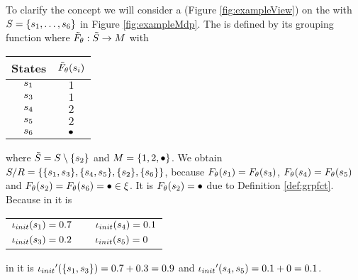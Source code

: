 \documentclass[preview]{standalone}
\begin{document}
\begin{exmp}
\sloppy
To clarify the concept we will consider a \viewN \view (Figure \ref{fig:exampleView}) on the \mdpN \mdp with ${S} = \{{s}_1, \dots, {s}_6\}$ in Figure \ref{fig:exampleMdp}. The \viewN \view is defined by its grouping function \grpfct where ${\tilde{F}_{{\theta}}} : {\tilde{{S}}} \to {\ensuremath{{M}}}$ with 

\begin{table}[h]
	\centering
	\begin{tabular}{c|c}
		States & ${\tilde{F}_{{\theta}}}({s}_i)$\\
		\hline
		${s}_1$ & $1$\\
		${s}_3$ & $1$\\
		${s}_4$ & $2$\\
		${s}_5$ & $2$\\
		${s}_6$ & ${\bullet}$\\
	\end{tabular}
\end{table}
where ${\tilde{{S}}} = {S} \setminus \{{s}_2\}$ and ${{M}} = \{1,2,{\bullet}\}$. We obtain ${{{S}}/{R}} = \{\{{s}_1, {s}_3\}, \{{s}_4, {s}_5\}, \{{s}_2\}, \{{s}_6\}\}$, because ${F_{{\theta}}}({s}_1) = {F_{{\theta}}}({s}_3)$, ${F_{{\theta}}}({s}_4) = {F_{{\theta}}}({s}_5)$ and ${F_{{\theta}}}({s}_2) = {F_{{\theta}}}({s}_6) = {\bullet} \in {\xi}$. It is ${F_{{\theta}}}({s}_2) = {\bullet}$ due to Definition \ref{def:grpfct}. 
Because in \chgph it is 
\begin{center}
	\begin{tabular}{lcl}
		${\iota_{init}}({s}_1) = 0.7$ & \quad\quad & ${\iota_{init}}({s}_4) = 0.1$\\
		${\iota_{init}}({s}_3) = 0.2$ & \quad\quad & ${\iota_{init}}({s}_5) = 0$\\
	\end{tabular}
\end{center}
in \view it is ${\iota_{init}}'(\{{s}_1,{s}_3\}) = 0.7 + 0.3 = 0.9$ and ${\iota_{init}}'({s}_4, {s}_5) = 0.1 + 0 = 0.1$. \pagebreak


\end{exmp}
\end{document}
